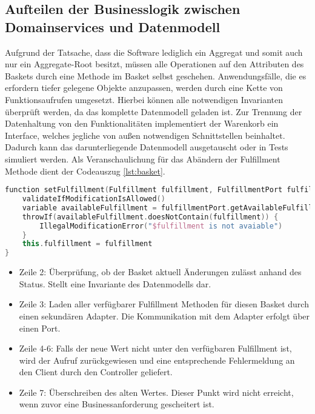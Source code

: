 \subsection{Aufteilen der Businesslogik zwischen Domainservices und Datenmodell}

Aufgrund der Tatsache, dass die Software lediglich ein Aggregat und somit auch nur ein Aggregate-Root besitzt, müssen alle Operationen auf den Attributen des Baskets durch eine Methode im Basket selbst geschehen. Anwendungsfälle, die es erfordern tiefer gelegene Objekte anzupassen, werden durch eine Kette von Funktionsaufrufen umgesetzt. Hierbei können alle notwendigen Invarianten überprüft werden, da das komplette Datenmodell geladen ist. Zur Trennung der Datenhaltung von den Funktionalitäten implementiert der Warenkorb ein Interface, welches jegliche von außen notwendigen Schnittstellen beinhaltet. Dadurch kann das darunterliegende Datenmodell ausgetauscht oder in Tests simuliert werden. Als Veranschaulichung für das Abändern der Fulfillment Methode dient der Codeauszug \ref{lst:basket}.

\begin{minipage}{\linewidth} %
	\begin{lstlisting}[caption={Setzen der Fulfillment Methode im Basket Aggregate}, label={lst:basket}, language=Kotlin]
function setFulfillment(Fulfillment fulfillment, FulfillmentPort fulfillmentPort) {
	validateIfModificationIsAllowed()
	variable availableFulfillment = fulfillmentPort.getAvailableFulfillment(outletId)
	throwIf(availableFulfillment.doesNotContain(fulfillment)) {
		IllegalModificationError("$fulfillment is not avaiable")
	}
	this.fulfillment = fulfillment
}
	\end{lstlisting}
\end{minipage}

\begin{itemize}[noitemsep,nolistsep]
	\item Zeile 2: Überprüfung, ob der Basket aktuell Änderungen zulässt anhand des Status. Stellt eine Invariante des Datenmodells dar.
	\item Zeile 3: Laden aller verfügbarer Fulfillment Methoden für diesen Basket durch einen sekundären Adapter. Die Kommunikation mit dem Adapter erfolgt über einen Port.
	\item Zeile 4-6: Falls der neue Wert nicht unter den verfügbaren Fulfillment ist, wird der Aufruf zurückgewiesen und eine entsprechende Fehlermeldung an den Client durch den Controller geliefert.
	\item Zeile 7: Überschreiben des alten Wertes. Dieser Punkt wird nicht erreicht, wenn zuvor eine Businessanforderung gescheitert ist.
\end{itemize}

